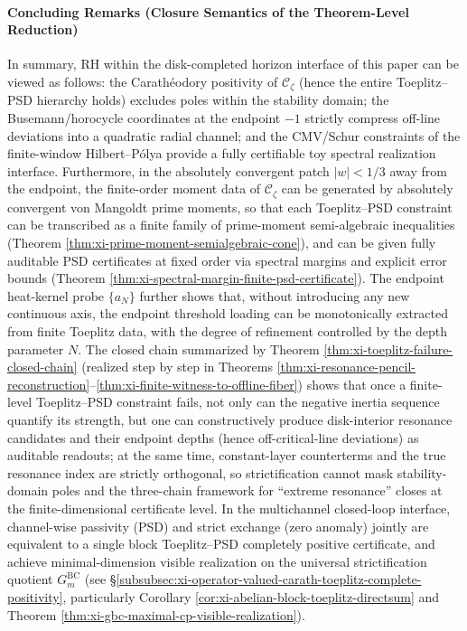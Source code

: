 \paragraph{Concluding Remarks (Closure Semantics of the Theorem-Level Reduction)}
In summary, RH within the disk-completed horizon interface of this paper can be viewed as follows: the Carath\'eodory positivity of \(\mathscr{C}_{\zeta}\) (hence the entire Toeplitz--PSD hierarchy holds) excludes poles within the stability domain; the Busemann/horocycle coordinates at the endpoint \(-1\) strictly compress off-line deviations into a quadratic radial channel; and the CMV/Schur constraints of the finite-window Hilbert--P{\'o}lya provide a fully certifiable toy spectral realization interface.
Furthermore, in the absolutely convergent patch \(|w|<1/3\) away from the endpoint, the finite-order moment data of \(\mathscr{C}_{\zeta}\) can be generated by absolutely convergent von Mangoldt prime moments, so that each Toeplitz--PSD constraint can be transcribed as a finite family of prime-moment semi-algebraic inequalities (Theorem \ref{thm:xi-prime-moment-semialgebraic-cone}), and can be given fully auditable PSD certificates at fixed order via spectral margins and explicit error bounds (Theorem \ref{thm:xi-spectral-margin-finite-psd-certificate}).
The endpoint heat-kernel probe \(\{a_N\}\) further shows that, without introducing any new continuous axis, the endpoint threshold loading can be monotonically extracted from finite Toeplitz data, with the degree of refinement controlled by the depth parameter \(N\).
The closed chain summarized by Theorem \ref{thm:xi-toeplitz-failure-closed-chain} (realized step by step in Theorems \ref{thm:xi-resonance-pencil-reconstruction}--\ref{thm:xi-finite-witness-to-offline-fiber}) shows that once a finite-level Toeplitz--PSD constraint fails, not only can the negative inertia sequence quantify its strength, but one can constructively produce disk-interior resonance candidates and their endpoint depths (hence off-critical-line deviations) as auditable readouts; at the same time, constant-layer counterterms and the true resonance index are strictly orthogonal, so strictification cannot mask stability-domain poles and the three-chain framework for ``extreme resonance'' closes at the finite-dimensional certificate level.
In the multichannel closed-loop interface, channel-wise passivity (PSD) and strict exchange (zero anomaly) jointly are equivalent to a single block Toeplitz--PSD completely positive certificate, and achieve minimal-dimension visible realization on the universal strictification quotient \(G^{\mathrm{BC}}_m\) (see \S\ref{subsubsec:xi-operator-valued-carath-toeplitz-complete-positivity}, particularly Corollary \ref{cor:xi-abelian-block-toeplitz-directsum} and Theorem \ref{thm:xi-gbc-maximal-cp-visible-realization}).
